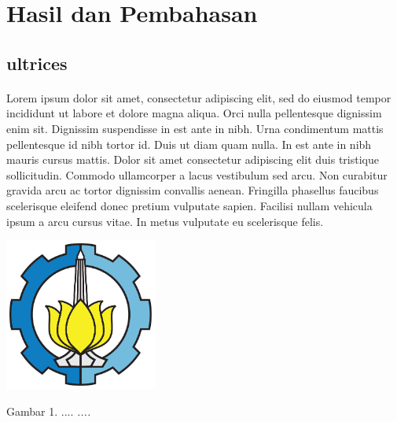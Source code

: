 \section{Hasil dan Pembahasan}
\subsection{ultrices}
\paragraph{}Lorem ipsum dolor sit amet, consectetur adipiscing elit, sed do eiusmod tempor incididunt ut labore et dolore magna aliqua. Orci nulla pellentesque dignissim enim sit. Dignissim suspendisse in est ante in nibh. Urna condimentum mattis pellentesque id nibh tortor id. Duis ut diam quam nulla. In est ante in nibh mauris cursus mattis. Dolor sit amet consectetur adipiscing elit duis tristique sollicitudin. Commodo ullamcorper a lacus vestibulum sed arcu. Non curabitur gravida arcu ac tortor dignissim convallis aenean. Fringilla phasellus faucibus scelerisque eleifend donec pretium vulputate sapien. Facilisi nullam vehicula ipsum a arcu cursus vitae. In metus vulputate eu scelerisque felis.
\begin{center}
\includegraphics[width=5cm]{img/logo.png}
\end{center}
\begin{center}
    Gambar 1. .... \textit{....}\\
\end{center}

\newpage
